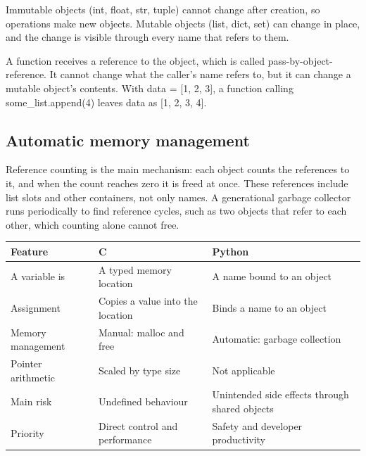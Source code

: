 \documentclass[11pt]{article}
\begin{document}
\begin{keepsection}
\begin{keepsection}
Immutable objects (int, float, str, tuple) cannot change after creation, so operations make new objects. Mutable objects (list, dict, set) can change in place, and the change is visible through every name that refers to them.

A function receives a reference to the object, which is called pass-by-object-reference. It cannot change what the caller’s name refers to, but it can change a mutable object’s contents. With data = [1, 2, 3], a function calling some\_list.append(4) leaves data as [1, 2, 3, 4].
\end{keepsection}

\begin{keepsection}
\subsection{Automatic memory management}

Reference counting is the main mechanism: each object counts the references to it, and when the count reaches zero it is freed at once. These references include list slots and other containers, not only names. A generational garbage collector runs periodically to find reference cycles, such as two objects that refer to each other, which counting alone cannot free.

\begin{center}\small\begin{tabularx}{\linewidth}{>{\raggedright\arraybackslash}X>{\raggedright\arraybackslash}X>{\raggedright\arraybackslash}X}\toprule
\textbf{Feature} & \textbf{C} & \textbf{Python} \\ \midrule
A variable is & A typed memory location & A name bound to an object \\
Assignment & Copies a value into the location & Binds a name to an object \\
Memory management & Manual: malloc and free & Automatic: garbage collection \\
Pointer arithmetic & Scaled by type size & Not applicable \\
Main risk & Undefined behaviour & Unintended side effects through shared objects \\
Priority & Direct control and performance & Safety and developer productivity \\
\bottomrule\end{tabularx}\end{center}


\end{keepsection}
\end{keepsection}
\end{document}
